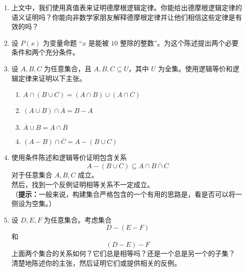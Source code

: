 \begin{enumerate}[label=(\arabic*)]
    \item 上文中，我们使用真值表来证明德摩根逻辑定律。你能给出德摩根逻辑定律的语义证明吗？你能向非数学家朋友解释德摩根定律并让他们相信这些定律是有效的吗？
    \item 设 $P(x)$ 为变量命题 ``$x$ 是能被 $10$ 整除的整数''。为这个陈述提出两个必要条件和两个充分条件。
    \item 设 $A,B,C$ 为任意集合，且 $A,B,C \subseteq U$，其中 $U$ 为全集。使用逻辑等价和逻辑定律来证明以下主张。
        \begin{enumerate}[label=(\alph*)]
            \item $A \cap (B \cup C) = (A \cap B) \cup (A \cap C)$
            \item $(A \cup B) \cap \overline{A} = B - A$
            \item $\overline{\overline{A} \cup B} = A \cap \overline{B}$
            \item $(A - B) \cap \overline{C} = A - (B \cup C)$
        \end{enumerate}
    \item 使用条件陈述和逻辑等价证明包含关系
        \[A - (B \cup C) \subseteq A \cap \overline{B \cap C}\]
        对于任意集合 $A,B,C$ 成立。\\
        然后，找到一个反例证明相等关系不一定成立。\\
        （\textbf{提示：}一般来说，构建集合严格包含的一个有用的思路是，看是否可以将一侧设为空集。）
    \item 设 $D,E,F$ 为任意集合。考虑集合
        \[D - (E - F)\]
        和
        \[(D - E) - F\]
        上面两个集合的关系如何？它们总是相等吗？还是一个总是另一个的子集？\\
        清楚地陈述你的主张，然后证明它们或提供相关的反例。
\end{enumerate}